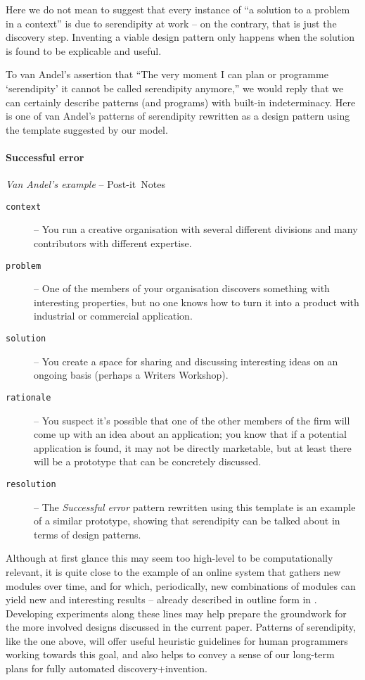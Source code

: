 Here we do not mean to suggest that every instance of ``a solution to a
problem in a context'' is due to serendipity at work -- on the
contrary, that is just the discovery step.  Inventing a viable design pattern
only happens when the solution is found to be explicable and useful.

To van Andel's assertion that ``The very moment I can plan or
programme `serendipity' it cannot be called serendipity anymore,'' we
would reply that we can certainly describe patterns (and programs)
with built-in indeterminacy.  Here is one of van Andel's patterns of
serendipity rewritten as a design pattern using the template suggested
by our model.

\begin{mdframed}
\vspace{-.35cm}
\paragraph{Successful error}
\emph{Van Andel's example} -- Post-it\texttrademark\ Notes\\[.05cm]
\begin{description}
\item[{\tt context}] -- You run a creative organisation with several different divisions and many contributors with different expertise.  
\item[{\tt problem}] -- One of the members of your organisation
  discovers something with interesting properties, but no one
  knows how to turn it into a product with industrial or commercial application.
\item[{\tt solution}] -- You create a space for sharing and discussing
  interesting ideas on an ongoing basis (perhaps a Writers Workshop).
\item[{\tt rationale}] -- You suspect it's possible that one of the
  other members of the firm will come up with an idea about an
  application; you know that if a potential application is found, it
  may not be directly marketable, but at least there will be a
  prototype that can be concretely discussed.
\item[{\tt resolution}] -- The \emph{Successful error} pattern
  rewritten using this template is an example of a similar
  prototype, showing that serendipity can be talked about in
  terms of design patterns.
\end{description}
\end{mdframed}

\bigskip

Although at first glance this may seem too high-level to be
computationally relevant, it is quite close to the example of an
online system that gathers new modules over time, and for which,
periodically, new combinations of modules can yield new and
interesting results -- already described in outline form in
\cite{pease2013discussion}.  
%
Developing experiments along these lines may help prepare the
groundwork for the more involved designs discussed in the current
paper.
%
Patterns of serendipity, like the one above, will offer useful
heuristic guidelines for human programmers working towards this goal,
and also helps to convey a sense of our long-term plans for fully
automated discovery+invention.

